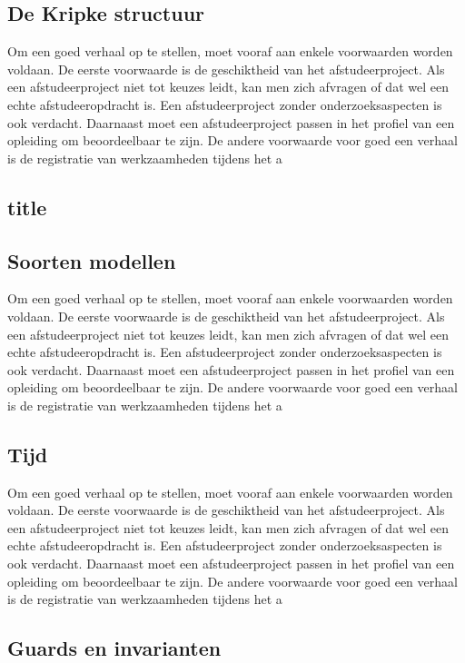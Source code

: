\subsection{De Kripke structuur}

Om een goed verhaal op te stellen, moet vooraf aan enkele voorwaarden
worden voldaan. De eerste voorwaarde is de geschiktheid van het
afstudeerproject. Als een afstudeerproject niet tot keuzes leidt, kan
men zich afvragen of dat wel een echte afstudeeropdracht is. Een
afstudeerproject zonder onderzoeksaspecten is ook verdacht. Daarnaast
moet een afstudeerproject passen in het profiel van een opleiding om
beoordeelbaar te zijn. De andere voorwaarde voor goed een verhaal is
de registratie van werkzaamheden tijdens het a

\subsection{title}

 
\subsection{Soorten modellen}

Om een goed verhaal op te stellen, moet vooraf aan enkele voorwaarden
worden voldaan. De eerste voorwaarde is de geschiktheid van het
afstudeerproject. Als een afstudeerproject niet tot keuzes leidt, kan
men zich afvragen of dat wel een echte afstudeeropdracht is. Een
afstudeerproject zonder onderzoeksaspecten is ook verdacht. Daarnaast
moet een afstudeerproject passen in het profiel van een opleiding om
beoordeelbaar te zijn. De andere voorwaarde voor goed een verhaal is
de registratie van werkzaamheden tijdens het a
\subsection{Tijd}

Om een goed verhaal op te stellen, moet vooraf aan enkele voorwaarden
worden voldaan. De eerste voorwaarde is de geschiktheid van het
afstudeerproject. Als een afstudeerproject niet tot keuzes leidt, kan
men zich afvragen of dat wel een echte afstudeeropdracht is. Een
afstudeerproject zonder onderzoeksaspecten is ook verdacht. Daarnaast
moet een afstudeerproject passen in het profiel van een opleiding om
beoordeelbaar te zijn. De andere voorwaarde voor goed een verhaal is
de registratie van werkzaamheden tijdens het a
\subsection{Guards en invarianten}

